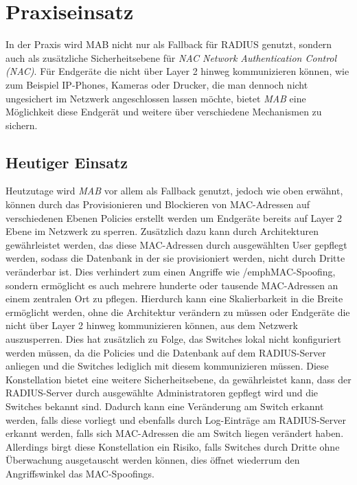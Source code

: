 \documentclass[conference]{IEEEtran}
\begin{document}
%

\vspace{1em}
\section{Praxiseinsatz}
In der Praxis wird MAB nicht nur als Fallback für RADIUS genutzt, sondern auch als zusätzliche Sicherheitsebene für \emph{NAC Network Authentication Control (NAC)}. Für Endgeräte die nicht über Layer 2 hinweg kommunizieren können, wie zum Beispiel IP-Phones, Kameras oder Drucker, die man dennoch nicht ungesichert im Netzwerk angeschlossen lassen möchte, bietet \emph{MAB} eine Möglichkeit diese Endgerät und weitere über verschiedene Mechanismen zu sichern.\\

\vspace{.5em}
\subsection{Heutiger Einsatz}
Heutzutage wird \emph{MAB} vor allem als Fallback genutzt, jedoch wie oben erwähnt, können durch das Provisionieren und Blockieren von MAC-Adressen auf verschiedenen Ebenen Policies erstellt werden um Endgeräte bereits auf Layer 2 Ebene im Netzwerk zu sperren. Zusätzlich dazu kann durch Architekturen gewährleistet werden, das diese MAC-Adressen durch ausgewählten User gepflegt werden, sodass die Datenbank in der sie provisioniert werden, nicht durch Dritte veränderbar ist. Dies verhindert zum einen Angriffe wie /emph{MAC-Spoofing}, sondern ermöglicht es auch mehrere hunderte oder tausende MAC-Adressen an einem zentralen Ort zu pflegen. Hierdurch kann eine Skalierbarkeit in die Breite ermöglicht werden, ohne die Architektur verändern zu müssen oder Endgeräte die nicht über Layer 2 hinweg kommunizieren können, aus dem Netzwerk auszusperren. Dies hat zusätzlich zu Folge, das Switches lokal nicht konfiguriert werden müssen, da die Policies und die Datenbank auf dem RADIUS-Server anliegen und die Switches lediglich mit diesem kommunizieren müssen.
Diese Konstellation bietet eine weitere Sicherheitsebene, da gewährleistet kann, dass der RADIUS-Server durch ausgewählte Administratoren gepflegt wird und die Switches bekannt sind. Dadurch kann eine Veränderung am Switch erkannt werden, falls diese vorliegt und ebenfalls durch Log-Einträge am RADIUS-Server erkannt werden, falls sich MAC-Adressen die am Switch liegen verändert haben. Allerdings birgt diese Konstellation ein Risiko, falls Switches durch Dritte ohne Überwachung ausgetauscht werden können, dies öffnet wiederrum den Angriffswinkel das MAC-Spoofings.\\
\end{document}
